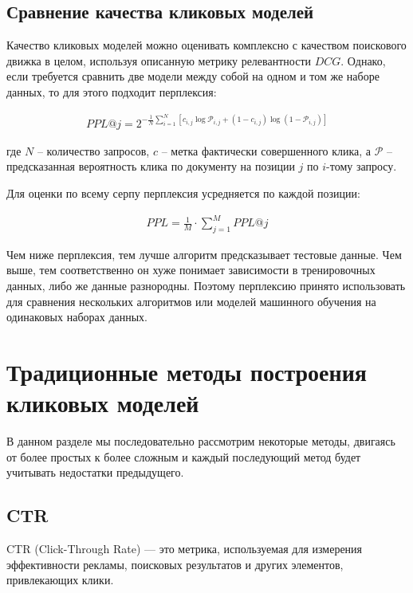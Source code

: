 \documentclass[diploma]{nanolab2015}
\begin{document}
\subsection{Сравнение качества кликовых моделей}
Качество кликовых моделей можно оценивать комплексно с качеством поискового движка в целом, используя описанную метрику релевантности $DCG$. Однако, если требуется сравнить две модели между собой на одном и том же наборе данных, то для этого подходит перплексия:

\begin{align}
    PPL@j = 2^{-\frac{1}{N}\sum_{i=1}^{N} \left[c_{i,j}\log\mathcal{P}_{i,j} + (1 - c_{i,j})\log(1 - \mathcal{P}_{i,j})\right]}
\end{align}

где $N$ -- количество запросов, $c$ -- метка фактически совершенного клика, а $\mathcal{P}$ -- предсказанная вероятность клика по документу на позиции $j$ по $i$-тому запросу.

Для оценки по всему серпу перплексия усредняется по каждой позиции:

\begin{align}
    PPL = \frac{1}{M} \cdot \sum_{j=1}^{M} PPL@j
\end{align}

Чем ниже перплексия, тем лучше алгоритм предсказывает тестовые данные. Чем выше, тем соответственно он хуже понимает зависимости в тренировочных данных, либо же данные разнородны. Поэтому перплексию принято использовать для сравнения нескольких алгоритмов или моделей машинного обучения на одинаковых наборах данных.

\section{Традиционные методы построения кликовых моделей}
В данном разделе мы последовательно рассмотрим некоторые методы, двигаясь от более простых к более сложным и каждый последующий метод будет учитывать недостатки предыдущего.
\subsection{CTR}
CTR (Click-Through Rate) — это метрика, используемая для измерения эффективности рекламы, поисковых результатов и других элементов, привлекающих клики. %
\end{document}
